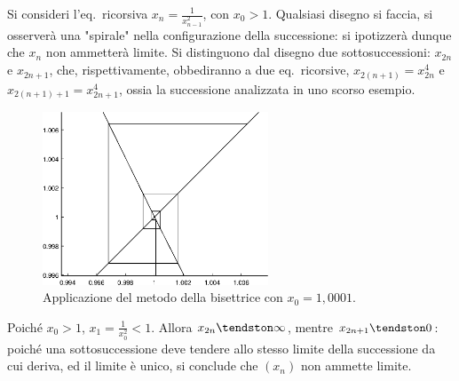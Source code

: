 \documentclass[11pt]{article}
\begin{document}
\begin{example}
    Si consideri l'eq.~ricorsiva $x_n = \frac{1}{x_{n-1}^2}$,
    con $x_0 > 1$.
    Qualsiasi disegno si faccia, si osserverà una "spirale"
    nella configurazione della successione: si ipotizzerà
    dunque che $x_n$ non ammetterà limite. Si distinguono
    dal disegno due sottosuccessioni: $x_{2n}$ e $x_{2n+1}$,
    che, rispettivamente, obbediranno a due eq.~ricorsive,
    $x_{2(n+1)} = x_{2n}^4$ e $x_{2(n+1) + 1} = x_{2n + 1}^4$,
    ossia la successione analizzata in uno scorso esempio. \\

    \begin{figure}[H]
        \centering
        \includegraphics[width=0.6\textwidth]{esempio2.eps}
        \caption{Applicazione del metodo della bisettrice con $x_0 = 1,0001$.}
        \label{fig:my_label}
    \end{figure}

    Poiché $x_0 > 1$, $x_1 = \frac{1}{x_0^2} < 1$. Allora
    $x_{2n} \tendston \infty$, mentre $x_{2n+1} \tendston
    0$: poiché una sottosuccessione deve tendere allo
    stesso limite della successione da cui deriva, ed il
    limite è unico, si conclude che $(x_n)$ non ammette
    limite.
\end{example}
\end{document}
